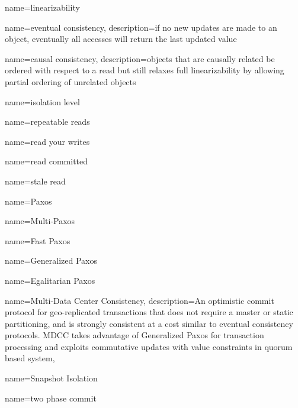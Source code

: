 %
%
%
%

{
    name=linearizability
}

{
    name={eventual consistency},
    description={if no new updates are made to an object, eventually all accesses will return the last updated value}
}

{
    name={causal consistency},
    description={objects that are causally related be ordered with respect to a read but still relaxes full linearizability by allowing partial ordering of unrelated objects}
}

{
    name={isolation level}
}

{
    name={repeatable reads}
}

{
    name={read your writes}
}

{
    name={read committed}
}

{
    name={stale read}
}

{
    name={Paxos}
}

{
    name={Multi-Paxos}
}

{
    name={Fast Paxos}
}

{
    name={Generalized Paxos}
}

{
    name={Egalitarian Paxos}
}

 {
  name={Multi-Data Center Consistency},
  description={An optimistic commit protocol for geo-replicated transactions that does not require a master or static partitioning, and is strongly consistent at a cost similar to eventual consistency protocols. MDCC takes advantage of Generalized Paxos for transaction processing and exploits commutative updates with value constraints in quorum based system},
}

 {
    name={Snapshot Isolation}
}

\newglossaryentry{2pc} {
    name={two phase commit}
}

